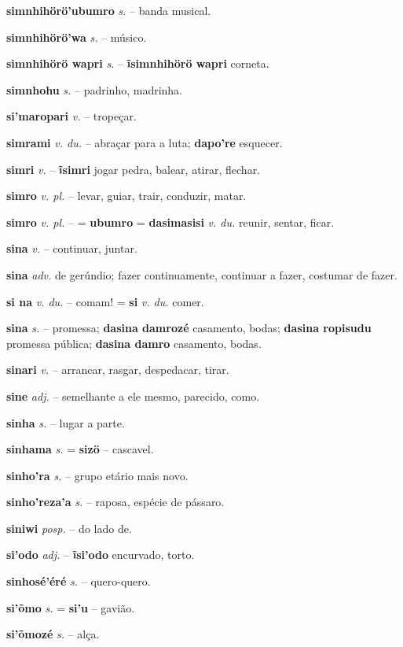\textbf{simnhihörö'ubumro} \textit{s.} -- banda musical.

\textbf{simnhihörö'wa} \textit{s.} -- músico.

\textbf{simnhihörö wapri} \textit{s.} -- \textbf{ĩsimnhihörö wapri} corneta.

\textbf{simnhohu} \textit{s.} -- padrinho, madrinha.

\textbf{si'maropari} \textit{v.} -- tropeçar.

\textbf{simrami} \textit{v. du.} -- abraçar para a luta; \textbf{dapo're} esquecer.

\textbf{simri} \textit{v.} -- \textbf{ĩsimri} jogar pedra, balear, atirar, flechar.

\textbf{simro} \textit{v. pl.} -- levar, guiar, trair, conduzir, matar.

\textbf{simro} \textit{v. pl.} -- = \textbf{ubumro} = \textbf{dasimasisi} \textit{v. du.} reunir, sentar, ficar.

\textbf{sina} \textit{v.} -- continuar, juntar.

\textbf{sina} \textit{adv.} de gerúndio; fazer continuamente, continuar a fazer, costumar de fazer.

\textbf{si na} \textit{v. du.} -- comam! = \textbf{si} \textit{v. du.} comer.

\textbf{sina} \textit{s.} -- promessa; \textbf{dasina damrozé} casamento, bodas; \textbf{dasina ropisudu} promessa pública; \textbf{dasina damro} casamento, bodas.

\textbf{sinari} \textit{v.} -- arrancar, rasgar, despedacar, tirar.

\textbf{sine} \textit{adj.} -- semelhante a ele mesmo, parecido, como.

\textbf{sinha} \textit{s.} -- lugar a parte.

\textbf{sinhama} \textit{s.} = \textbf{sizö} -- cascavel.

\textbf{sinho'ra} \textit{s.} -- grupo etário mais novo.

\textbf{sinho'reza'a} \textit{s.} -- raposa, espécie de pássaro.

\textbf{siniwi} \textit{posp.} -- do lado de.

\textbf{si'odo} \textit{adj.} -- \textbf{ĩsi'odo} encurvado, torto.

\textbf{sinhosé'éré} \textit{s.} -- quero-quero.

\textbf{si'õmo} \textit{s.} = \textbf{si'u} -- gavião.

\textbf{si'õmozé} \textit{s.} -- alça.

